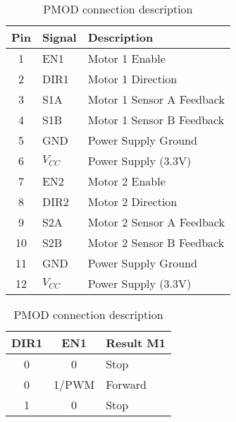 \documentclass[Main]{subfiles}
\begin{document}
			\begin{table}[H]
				\centering
				\begin{subtable}[b]{0.6\linewidth}
					\begin{tabular}{|c|l|l|}
						\hline
						{\bf Pin} & {\bf Signal} & {\bf Description}         \\ \hline
						1         & EN1          & Motor 1 Enable            \\ \hline
						2         & DIR1         & Motor 1 Direction         \\ \hline
						3         & S1A          & Motor 1 Sensor A Feedback \\ \hline
						4         & S1B          & Motor 1 Sensor B Feedback \\ \hline
						5         & GND          & Power Supply Ground       \\ \hline
						6         & $V_{CC}$     & Power Supply (3.3V)       \\ \hline
						7         & EN2          & Motor 2 Enable            \\ \hline
						8         & DIR2         & Motor 2 Direction         \\ \hline
						9         & S2A          & Motor 2 Sensor A Feedback \\ \hline
						10        & S2B          & Motor 2 Sensor B Feedback \\ \hline
						11        & GND          & Power Supply Ground       \\ \hline
						12        & $V_{CC}$   & Power Supply (3.3V)       \\ \hline
					\end{tabular}
					\caption{PMOD connection description}
					\label{tab:dhb_pmod}
				\end{subtable}
				\begin{subtable}[b]{0.3\linewidth}
					\centering
					\begin{tabular}{ccl}
						\hline
						\multicolumn{1}{|c|}{{\bf DIR1}} & \multicolumn{1}{c|}{{\bf EN1}} & \multicolumn{1}{l|}{{\bf Result M1}} \\ \hline
						\multicolumn{1}{|c|}{0}          & \multicolumn{1}{c|}{0}         & \multicolumn{1}{l|}{Stop}            \\ \hline
						\multicolumn{1}{|c|}{0}          & \multicolumn{1}{c|}{1/PWM}     & \multicolumn{1}{l|}{Forward}         \\ \hline
						\multicolumn{1}{|c|}{1}          & \multicolumn{1}{c|}{0}         & \multicolumn{1}{l|}{Stop}            \\ \hline

\end{tabular}
\end{subtable}
\end{table}
\end{document}
